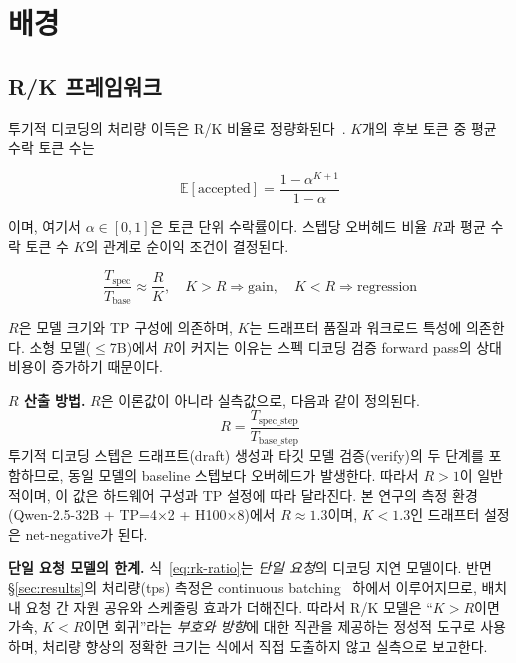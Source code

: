 
\section{배경}
\label{sec:background}

\subsection{R/K 프레임워크}
\label{subsec:rk-framework}

투기적 디코딩의 처리량 이득은 R/K 비율로 정량화된다~\cite{leviathan2023spec}.
$K$개의 후보 토큰 중 평균 수락 토큰 수는

\begin{equation}
\mathbb{E}[\text{accepted}] = \frac{1 - \alpha^{K+1}}{1 - \alpha}
\label{eq:expected-accept}
\end{equation}

이며, 여기서 $\alpha \in [0,1]$은 토큰 단위 수락률이다.
스텝당 오버헤드 비율 $R$과 평균 수락 토큰 수 $K$의 관계로
순이익 조건이 결정된다.

\begin{equation}
\frac{T_{\text{spec}}}{T_{\text{base}}} \approx \frac{R}{K}, \quad
K > R \Rightarrow \text{gain}, \quad K < R \Rightarrow \text{regression}
\label{eq:rk-ratio}
\end{equation}

$R$은 모델 크기와 TP 구성에 의존하며, $K$는 드래프터 품질과 워크로드 특성에 의존한다.
소형 모델($\leq$7B)에서 $R$이 커지는 이유는
스펙 디코딩 검증 forward pass의 상대 비용이 증가하기 때문이다.

\textbf{$R$ 산출 방법.}
$R$은 이론값이 아니라 실측값으로, 다음과 같이 정의된다.
\begin{equation}
R = \frac{T_{\text{spec\_step}}}{T_{\text{base\_step}}}
\label{eq:r-measured}
\end{equation}
투기적 디코딩 스텝은 드래프트(draft) 생성과 타깃 모델 검증(verify)의
두 단계를 포함하므로, 동일 모델의 baseline 스텝보다 오버헤드가 발생한다.
따라서 $R > 1$이 일반적이며, 이 값은 하드웨어 구성과 TP 설정에 따라 달라진다.
본 연구의 측정 환경(Qwen-2.5-32B + TP=4$\times$2 + H100$\times$8)에서
$R \approx 1.3$이며, $K < 1.3$인 드래프터 설정은 net-negative가 된다.

\textbf{단일 요청 모델의 한계.}
식~\ref{eq:rk-ratio}는 \emph{단일 요청}의 디코딩 지연 모델이다.
반면 \S\ref{sec:results}의 처리량(tps) 측정은 continuous batching~\cite{yu2022orca}
하에서 이루어지므로, 배치 내 요청 간 자원 공유와 스케줄링 효과가 더해진다.
따라서 R/K 모델은 ``$K > R$이면 가속, $K < R$이면 회귀''라는
\emph{부호와 방향}에 대한 직관을 제공하는 정성적 도구로 사용하며,
처리량 향상의 정확한 크기는 식에서 직접 도출하지 않고 실측으로 보고한다.

